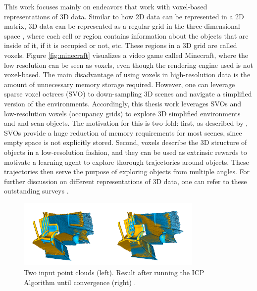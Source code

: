 This work focuses mainly on endeavors that work with voxel-based representations of 3D data. Similar to how 2D data can be represented in a 2D matrix, 3D data can be represented as a regular grid in the three-dimensional space \cite{ahmed2018survey}, where each cell or region contains information about the objects that are inside of it, if it is occupied or not, etc. These regions in a 3D grid are called voxels. Figure \ref{fig:minecraft} visualizes a video game called Minecraft, where the low resolution can be seen as voxels, even though the rendering engine used is not voxel-based. The main disadvantage of using voxels in high-resolution data is the amount of unnecessary memory storage required. However, one can leverage sparse voxel octrees (SVO) to down-sampling 3D scenes and navigate a simplified version of the environments. Accordingly, this thesis work leverages SVOs and low-resolution voxels (occupancy grids) to explore 3D simplified environments and and scan objects. The motivation for this is two-fold: first, as described by \cite{mcgraw2020high}, SVOs provide a huge reduction of memory requirements for most scenes, since empty space is not explicitly stored. Second, voxels describe the 3D structure of objects in a low-resolution fashion, and they can be used as extrinsic rewards to motivate a learning agent to explore thorough trajectories around objects. These trajectories then serve the purpose of exploring objects from multiple angles. %
For further discussion on different representations of 3D data, one can refer to these outstanding surveys \cite{ahmed2018survey, ioannidou2017deep}. 


\begin{figure}[!ht]
        \centering
        \includegraphics[width=0.8\textwidth]{images/icpalgorithm.png}
        \caption{Two input point clouds (left). Result after running the ICP Algorithm until convergence (right) \cite{open3D2021icp}.
        }
        \label{fig:icpalgorithm}
\end{figure}


